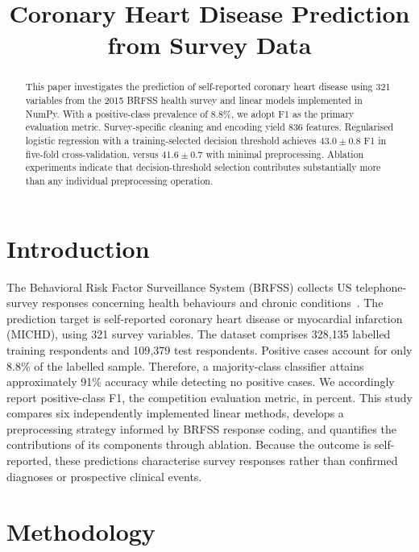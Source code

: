 \documentclass[10pt,conference]{IEEEtran}
\newcommand{\cvMin}{$41.6\pm0.7$}
\newcommand{\cvFull}{$43.0\pm0.8$}
\begin{document}
\title{Coronary Heart Disease Prediction from Survey Data}

\author{


}

\maketitle

\begin{abstract}
This paper investigates the prediction of self-reported coronary heart
disease using 321 variables from the 2015 BRFSS health survey and linear
models implemented in NumPy. With a positive-class prevalence of 8.8\%,
we adopt F1 as the primary evaluation metric. Survey-specific cleaning
and encoding yield 836 features. Regularised logistic regression with a
training-selected decision threshold achieves \cvFull{} F1 in five-fold
cross-validation, versus \cvMin{} with minimal preprocessing. Ablation
experiments indicate that decision-threshold selection contributes
substantially more than any individual preprocessing operation.

\end{abstract}

\section{Introduction}
The Behavioral Risk Factor Surveillance System (BRFSS) collects US
telephone-survey responses concerning health behaviours and chronic
conditions~\cite{brfss}. The prediction target is self-reported coronary
heart disease or myocardial infarction (MICHD), using 321 survey
variables. The dataset comprises 328{,}135 labelled training respondents
and 109{,}379 test respondents. Positive cases account for only 8.8\% of
the labelled sample. Therefore, a majority-class classifier attains
approximately 91\% accuracy while detecting no positive cases. We
accordingly report positive-class F1, the competition evaluation metric,
in percent. This study compares six independently implemented linear methods,
develops a preprocessing strategy informed by BRFSS response coding, and
quantifies the contributions of its components through ablation.
Because the outcome is self-reported, these predictions characterise
survey responses rather than confirmed diagnoses or
prospective clinical events.

\section{Methodology}
\end{document}
